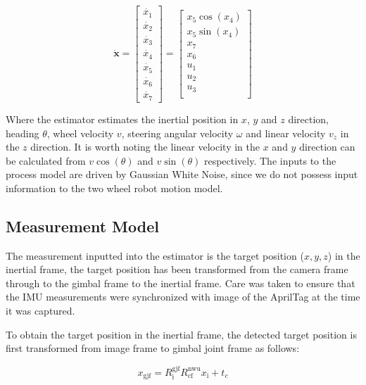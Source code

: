 \documentclass[letterpaper, 10 pt, conference]{ieeeconf}
\begin{document}
\begin{equation}
    \dot{\textbf{x}} = \begin{bmatrix}
        \dot{x_{1}} \\ 
        \dot{x_{2}} \\ 
        \dot{x_{3}} \\ 
        \dot{x_{4}} \\
        \dot{x_{5}} \\
        \dot{x_{6}} \\
        \dot{x_{7}}
    \end{bmatrix} =
    \begin{bmatrix}
        x_{5} \cos(x_{4}) \\
        x_{5} \sin(x_{4}) \\
        x_{7} \\
        x_{6} \\
        u_{1} \\
        u_{2} \\
        u_{3} \\
    \end{bmatrix}
\end{equation}

Where the estimator estimates the inertial position in $x$, $y$ and $z$
direction, heading $\theta$, wheel velocity $v$, steering angular velocity
$\omega$ and linear velocity $v_{z}$ in the $z$ direction. It is worth
noting the linear velocity in the $x$ and $y$ direction can be calculated
from $v \cos(\theta)$ and $v \sin(\theta)$ respectively. The inputs to the
process model are driven by Gaussian White Noise, since we do not possess
input information to the two wheel robot motion model.

\subsection{Measurement Model}
The measurement inputted into the estimator is the target position ($x, y,
z$) in the inertial frame, the target position has been transformed from
the camera frame through to the gimbal frame to the inertial frame. Care
was taken to ensure that the IMU measurements were synchronized with image
of the AprilTag at the time it was captured.

To obtain the target position in the inertial frame, the detected target
position is first transformed from image frame to gimbal joint frame as
follows:

\begin{equation}
  x_{\text{gjf}} = R^{\text{gjf}}_{\text{i}}
    R^{\text{nwu}}_{\text{cf}}
    x_{\text{i}} + t_{c}
\end{equation}
\end{document}

